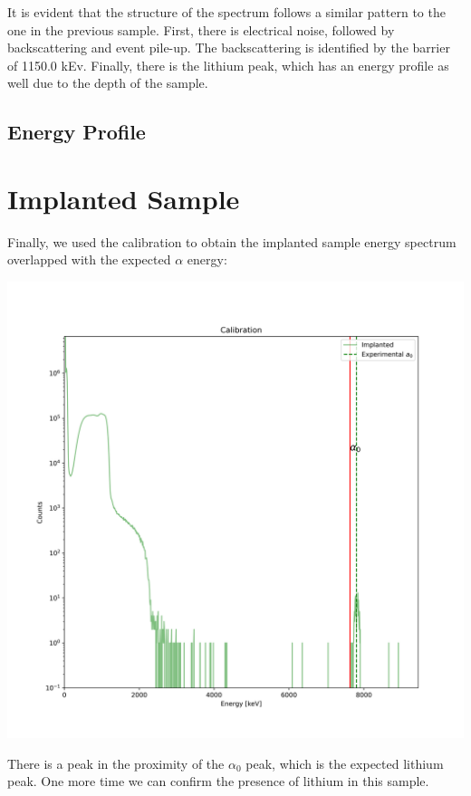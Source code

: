 \documentclass{article}
\begin{document}
\begin{multicols}{2}
It is evident that the structure of the spectrum follows a similar pattern to the one in the previous sample.
First, there is electrical noise, followed by backscattering and event pile-up. 
The backscattering is identified by the barrier of 1150.0 kEv.
Finally, there is the lithium peak, which has an energy profile as well due to the depth of the sample.


\subsection{Energy Profile}



\section{Implanted Sample}

Finally, we used the calibration to obtain the implanted sample energy spectrum overlapped with the expected $\alpha$ energy:
\begin{center}
    \label{TT_21}
    \centering
    \includegraphics[scale = 0.35]{../../images/OverlapImplanted.png}
\end{center}

There is a peak in the proximity of the $\alpha_0$ peak, which is the expected lithium peak.
One more time we can confirm the presence of lithium in this sample.


\end{multicols}
\end{document}
